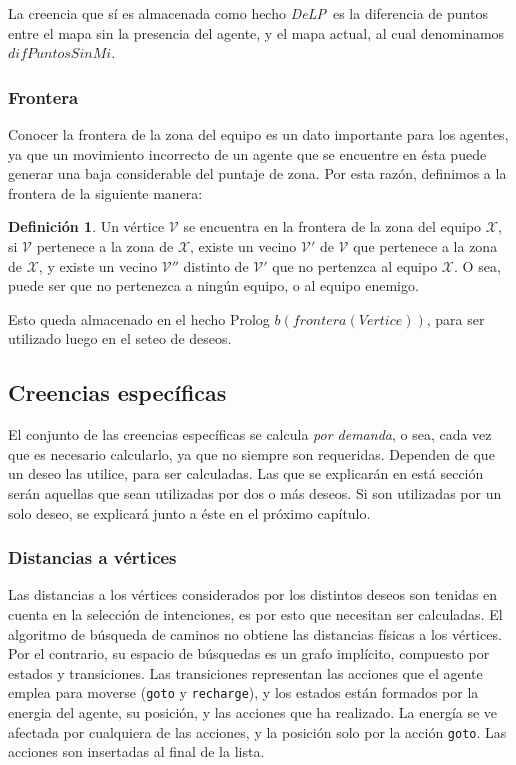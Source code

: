 \documentclass[oneside]{book}
\theoremstyle{definition}
\newtheorem{definicion}{Definición}[section]
\theoremstyle{example}
\newcommand{\DLP}{\mbox{\textit{DeLP}}}
\newcommand{\lit}[1]{\mbox{$ #1$}}
\begin{document}
La creencia que sí es almacenada como hecho \DLP\ es la diferencia de puntos entre
el mapa sin la presencia del agente, y el mapa actual, al cual denominamos
\lit{difPuntosSinMi}.


\subsubsection{Frontera}

Conocer la frontera de la zona del equipo es un dato importante para los agentes,
ya que un movimiento incorrecto de un agente que se encuentre en ésta puede 
generar una baja considerable del puntaje de zona. Por esta razón, definimos a
la frontera de la siguiente manera:

\begin{definicion}
Un vértice $\mathcal V$ se encuentra en la frontera de la zona del equipo 
$\mathcal X$, si $\mathcal V$ pertenece a la zona de $\mathcal X$, existe un 
vecino $\mathcal V'$ de $\mathcal V$ que pertenece a la zona de $\mathcal X$, 
y existe un vecino $\mathcal V''$ distinto de $\mathcal V'$ que no pertenzca 
al equipo $\mathcal X$. O sea, puede ser que no pertenezca a ningún equipo, o 
al equipo enemigo.
\end{definicion}

Esto queda almacenado en el hecho Prolog \lit{b(frontera(Vertice))}, para ser
utilizado luego en el seteo de deseos.

\subsection{Creencias específicas}

\label{sec:creenciasEspecificas}

El conjunto de las creencias específicas se calcula \textit{por demanda}, o sea, 
cada vez que es necesario calcularlo, ya que no siempre son requeridas. Dependen
de que un deseo las utilice, para ser calculadas. Las que se explicarán en está
sección serán aquellas que sean utilizadas por dos o más deseos. Si son 
utilizadas por un solo deseo, se explicará junto a éste en el próximo capítulo.

\subsubsection{Distancias a vértices}

Las distancias a los vértices considerados por los distintos deseos son tenidas en 
cuenta en la selección de intenciones, es por esto que necesitan ser calculadas.
El algoritmo de búsqueda de caminos no obtiene las distancias físicas a los vértices.
Por el contrario, su espacio de búsquedas es un grafo implícito, compuesto por estados
y transiciones. Las transiciones representan las acciones que el agente emplea
para moverse (\texttt{goto} y \texttt{recharge}), y los estados están formados por 
la energia del agente, su posición, y las acciones que ha realizado. La energía se ve
afectada por cualquiera de las acciones, y la posición solo por la acción \texttt{goto}.
Las acciones son insertadas al final de la lista.
\end{document}
